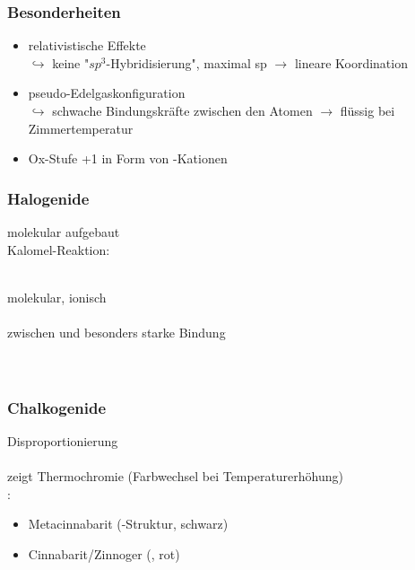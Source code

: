 \documentclass{article}
\begin{document}
\subsubsection{Besonderheiten}
\begin{itemize}
    \item relativistische Effekte\\$\hookrightarrow$ keine "$sp^3$-Hybridisierung", maximal sp $\rightarrow$ lineare Koordination
    \item pseudo-Edelgaskonfiguration\\$\hookrightarrow$ schwache Bindungskräfte zwischen den Atomen $\rightarrow$ flüssig bei Zimmertemperatur
    \item Ox-Stufe +1 in Form von -Kationen
\end{itemize}

\subsubsection{Halogenide}
 molekular aufgebaut\\
Kalomel-Reaktion:\\
\begin{center}
    \\
     molekular,  ionisch\\
    \\
    zwischen  und  besonders starke Bindung\\
    \\
    \\
\end{center}

\subsubsection{Chalkogenide}
\begin{center}
     Disproportionierung\\
    \\
     zeigt Thermochromie (Farbwechsel bei Temperaturerhöhung)\\
    :
    \begin{itemize}
        \item Metacinnabarit (-Struktur, schwarz)
        \item Cinnabarit/Zinnoger (, rot)
    \end{itemize}
\end{center}
\end{document}
